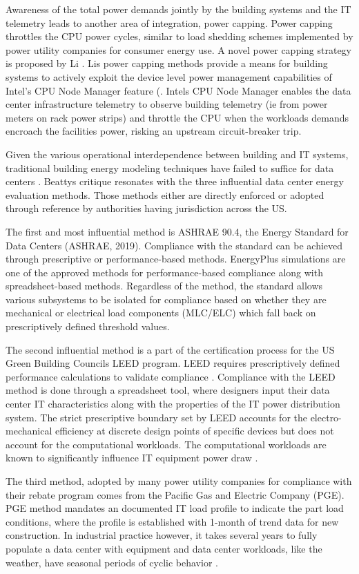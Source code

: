 {Awareness of the total power demands jointly by the building system\textsc{}s and the IT telemetry leads to another area of integration, power capping. Power capping throttles the CPU power cycles, similar to load shedding schemes implemented by power utility companies for consumer energy use. A novel power capping strategy is proposed by Li \citep{Li18}. Li\textsc{}s power capping methods provide a means for building systems to actively exploit the device level power management capabilities of Intel’s CPU Node Manager feature (\citep{intel15}. Intel\textsc{}s CPU Node Manager enables the data center infrastructure telemetry to observe building telemetry (ie from power meters on rack power strips) and throttle the CPU when the workloads demands encroach the facilities power, risking an upstream circuit-breaker trip.

Given the various operational interdependence between building and IT systems, traditional building energy modeling techniques have failed to suffice for data centers \citep{Beatty15}. Beatty\textsc{}s critique resonates with the three influential data center energy evaluation methods. Those methods either are directly enforced or adopted through reference by authorities having jurisdiction across the US. 

The first and most influential method is ASHRAE 90.4, the Energy Standard for Data Centers (ASHRAE, 2019). Compliance with the standard can be achieved through prescriptive or performance-based methods. EnergyPlus simulations are one of the approved methods for performance-based compliance along with spreadsheet-based methods. Regardless of the method, the standard allows various subsystems to be isolated for compliance based on whether they are mechanical or electrical load components (MLC/ELC) which fall back on prescriptively defined threshold values.

The second influential method is a part of the certification process for the US Green Building Council\textsc{}s LEED program. LEED requires prescriptively defined performance calculations to validate compliance \citep{LEED16}. Compliance with the LEED method is done through a spreadsheet tool, where designers input their data center IT characteristics along with the properties of the IT power distribution system. The strict prescriptive boundary set by LEED accounts for the electro-mechanical efficiency at discrete design points of specific devices but does not account for the computational workloads. The computational workloads are known to significantly influence IT equipment power draw \citep{marculescu20}.  

The third method, adopted by many power utility companies for compliance with their rebate program comes from the Pacific Gas and Electric Company (PGE). PGE method mandates an documented IT load profile to indicate the part load conditions, where the profile is established with 1-month of trend data for new construction. In industrial practice however, it takes several years to fully populate a data center with equipment and data center workloads, like the weather, have seasonal periods of cyclic behavior \citep{zhuang15}.}

